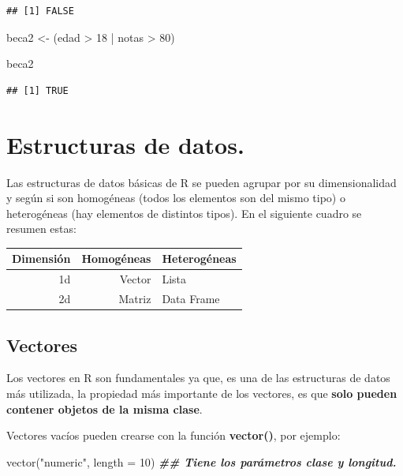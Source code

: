 \documentclass[
  12pt,
]{book}
\newenvironment{Shaded}{\begin{snugshade}}{\end{snugshade}}
\newcommand{\AttributeTok}[1]{\textcolor[rgb]{0.77,0.63,0.00}{#1}}
\newcommand{\DecValTok}[1]{\textcolor[rgb]{0.00,0.00,0.81}{#1}}
\newcommand{\DocumentationTok}[1]{\textcolor[rgb]{0.56,0.35,0.01}{\textbf{\textit{#1}}}}
\newcommand{\FunctionTok}[1]{\textcolor[rgb]{0.00,0.00,0.00}{#1}}
\newcommand{\NormalTok}[1]{#1}
\newcommand{\OtherTok}[1]{\textcolor[rgb]{0.56,0.35,0.01}{#1}}
\newcommand{\SpecialCharTok}[1]{\textcolor[rgb]{0.00,0.00,0.00}{#1}}
\newcommand{\StringTok}[1]{\textcolor[rgb]{0.31,0.60,0.02}{#1}}
\begin{document}
\begin{verbatim}
## [1] FALSE
\end{verbatim}

\begin{Shaded}
\begin{Highlighting}[]
\NormalTok{beca2 }\OtherTok{\textless{}{-}}\NormalTok{ (edad }\SpecialCharTok{\textgreater{}} \DecValTok{18} \SpecialCharTok{|}\NormalTok{ notas }\SpecialCharTok{\textgreater{}} \DecValTok{80}\NormalTok{)}

\NormalTok{beca2}
\end{Highlighting}
\end{Shaded}

\begin{verbatim}
## [1] TRUE
\end{verbatim}

\hypertarget{estructuras-de-datos.}{%
\chapter{\texorpdfstring{\textbf{Estructuras de datos.}}{Estructuras de datos.}}\label{estructuras-de-datos.}}

Las estructuras de datos básicas de R se pueden agrupar por su dimensionalidad y según si son homogéneas (todos los elementos son del mismo tipo) o heterogéneas (hay elementos de distintos tipos). En el siguiente cuadro se resumen estas:

\begin{longtable}[]{@{}rrl@{}}
\toprule
Dimensión & Homogéneas & Heterogéneas\tabularnewline
\midrule
\endhead
1d & Vector & Lista\tabularnewline
2d & Matriz & Data Frame\tabularnewline
\bottomrule
\end{longtable}

\hypertarget{vectores}{%
\section{\texorpdfstring{\textbf{Vectores}}{Vectores}}\label{vectores}}

Los vectores en R son fundamentales ya que, es una de las estructuras de datos más utilizada, la propiedad más importante de los vectores, es que \textbf{solo pueden contener objetos de la misma clase}.

Vectores vacíos pueden crearse con la función \textbf{vector()}, por ejemplo:

\begin{Shaded}
\begin{Highlighting}[]
\FunctionTok{vector}\NormalTok{(}\StringTok{"numeric"}\NormalTok{, }\AttributeTok{length =} \DecValTok{10}\NormalTok{) }\DocumentationTok{\#\# Tiene los parámetros clase y longitud.}
\end{Highlighting}
\end{Shaded}
\end{document}
